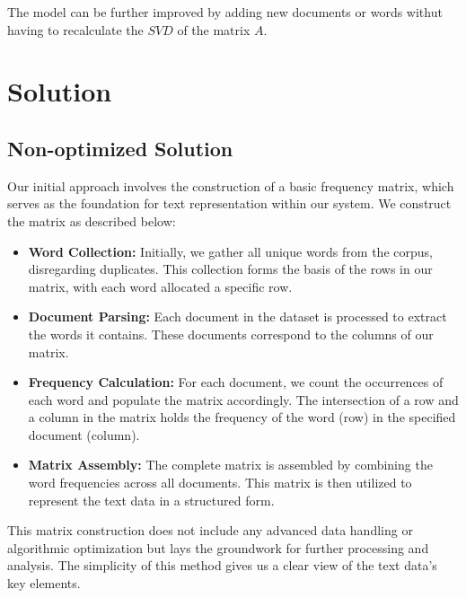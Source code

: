 \documentclass[12pt,a4paper]{article}
\begin{document}
\bigskip
\noindent The model can be further improved by adding new documents or words withut having to recalculate the $SVD$ of the matrix $A$.

\newpage
\section{Solution}

\subsection{Non-optimized Solution}

Our initial approach involves the construction of a basic frequency matrix, which serves as the foundation for text representation within our system. We construct the matrix as described below:

\begin{itemize}
    \item \textbf{Word Collection:} Initially, we gather all unique words from the corpus, disregarding duplicates. This collection forms the basis of the rows in our matrix, with each word allocated a specific row.
    \item \textbf{Document Parsing:} Each document in the dataset is processed to extract the words it contains. These documents correspond to the columns of our matrix.
    \item \textbf{Frequency Calculation:} For each document, we count the occurrences of each word and populate the matrix accordingly. The intersection of a row and a column in the matrix holds the frequency of the word (row) in the specified document (column).
    \item \textbf{Matrix Assembly:} The complete matrix is assembled by combining the word frequencies across all documents. This matrix is then utilized to represent the text data in a structured form.
\end{itemize}

\noindent This matrix construction does not include any advanced data handling or algorithmic optimization but lays the groundwork for further processing and analysis. The simplicity of this method gives us a clear view of the text data's key elements.
\end{document}
